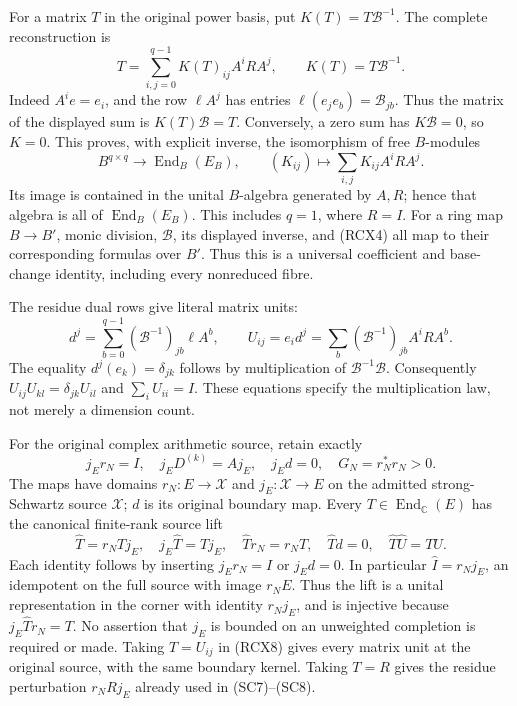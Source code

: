 \documentclass{article}
\begin{document}
For a matrix \(T\) in the original power basis, put
\(K(T)=T\mathcal B^{-1}\). The complete reconstruction is
\[
 \boxed{
 T=\sum_{i,j=0}^{q-1}K(T)_{ij}A^iRA^j,\qquad
 K(T)=T\mathcal B^{-1}.}
 \tag{RCX4}
\]
Indeed \(A^ie=e_i\), and the row \(\ell A^j\) has entries
\(\ell(e_je_b)=\mathcal B_{jb}\). Thus the matrix of the displayed
sum is \(K(T)\mathcal B=T\). Conversely, a zero sum has
\(K\mathcal B=0\), so \(K=0\). This proves, with explicit inverse,
the isomorphism of free \(B\)-modules
\[
 B^{q\times q}\longrightarrow\operatorname{End}_B(E_B),
 \qquad (K_{ij})\longmapsto\sum_{i,j}K_{ij}A^iRA^j.
 \tag{RCX5}
\]
Its image is contained in the unital \(B\)-algebra generated by \(A,R\);
hence that algebra is all of \(\operatorname{End}_B(E_B)\).
This includes \(q=1\), where \(R=I\). For a ring map \(B\to B'\),
monic division, \(\mathcal B\), its displayed inverse, and (RCX4)
all map to their corresponding formulas over \(B'\). Thus this is
a universal coefficient and base-change identity, including every
nonreduced fibre.

The residue dual rows give literal matrix units:
\[
 d^j=\sum_{b=0}^{q-1}(\mathcal B^{-1})_{jb}\ell A^b,\qquad
 U_{ij}=e_i d^j
       =\sum_b(\mathcal B^{-1})_{jb}A^iRA^b.
 \tag{RCX6}
\]
The equality \(d^j(e_k)=\delta_{jk}\) follows by multiplication of
\(\mathcal B^{-1}\mathcal B\). Consequently
\(U_{ij}U_{kl}=\delta_{jk}U_{il}\) and
\(\sum_iU_{ii}=I\). These equations specify the multiplication law,
not merely a dimension count.

For the original complex arithmetic source, retain exactly
\[
 j_Er_N=I,\quad j_ED^{(k)}=Aj_E,\quad j_Ed=0,\quad
 G_N=r_N^*r_N>0.
 \tag{RCX7}
\]
The maps have domains \(r_N:E\to\mathscr X\) and
\(j_E:\mathscr X\to E\) on the admitted strong-Schwartz source
\(\mathscr X\); \(d\) is its original boundary map. Every
\(T\in\operatorname{End}_{\mathbb C}(E)\) has the canonical finite-rank
source lift
\[
 \widehat T=r_NTj_E,\quad
 j_E\widehat T=Tj_E,\quad
 \widehat T r_N=r_NT,\quad
 \widehat T d=0,\quad
 \widehat T\widehat U=\widehat{TU}.
 \tag{RCX8}
\]
Each identity follows by inserting \(j_Er_N=I\) or \(j_Ed=0\).
In particular \(\widehat I=r_Nj_E\), an idempotent on the full
source with image \(r_NE\). Thus the lift is a unital representation
in the corner with identity \(r_Nj_E\), and is injective because
\(j_E\widehat T r_N=T\). No assertion that \(j_E\) is bounded on
an unweighted completion is required or made. Taking \(T=U_{ij}\)
in (RCX8) gives every matrix unit at the original source, with the
same boundary kernel. Taking \(T=R\) gives the residue perturbation
\(r_NRj_E\) already used in (SC7)--(SC8).
\end{document}

